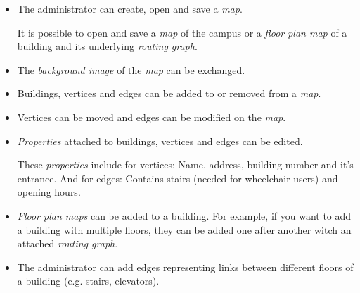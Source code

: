 \begin{itemize}
	\item The administrator can create, open and save a \textit{map}.
		\begin{addmargin}[7mm]{0mm}
			It is possible to open and save a \textit{map} of the campus or a \textit{floor plan map} of a building and its underlying \textit{routing graph}.
		\end{addmargin}
	\item The \textit{background image} of the \textit{map} can be exchanged.
	\item Buildings, vertices and edges can be added to or removed from a \textit{map}.
	\item Vertices can be moved and edges can be modified on the \textit{map}.
	\item \textit{Properties} attached to buildings, vertices and edges can be edited.
		\begin{addmargin}[7mm]{0mm}
			These \textit{properties} include for vertices: Name, address, building number and it's entrance. And for edges: Contains stairs (needed for wheelchair users) and opening hours.
		\end{addmargin}
	\item \textit{Floor plan maps} can be added to a building. For example, if you want to add a building with multiple floors, they can be added one after another witch an attached \textit{routing graph}.

	\item The administrator can add edges representing links between different floors of a building (e.g. stairs, elevators).

\end{itemize}

